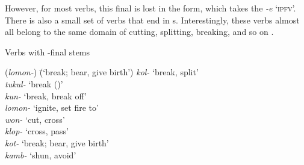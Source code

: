However, for most verbs, this final  is lost in the  form, which takes the  \textit{{}-e} ‘\textsc{ipfv}’. There is also a small set of verbs that end in s. Interestingly, these verbs almost all belong to the same  domain of cutting, splitting, breaking, and so on .

\newpage

\ea%
    \label{ex:verbs:1e}
            Verbs with -final stems\\
\begin{tabbing}
{(\textit{lomon-})} \= {(‘break; bear, give birth’)}\kill
\textit{kol-} \> {‘break, split’}\\
\textit{tukul-} \> {‘break ()’}\\
\textit{kun-} \> {‘break, break off’}\\
\textit{lomon-} \> {‘ignite, set fire to’}\\
\textit{won-} \> {‘cut, cross’}\\
\textit{klop-} \> {‘cross, pass’}\\
\textit{kot-} \> {‘break; bear, give birth’}\\
\textit{kamb-} \> {‘shun, avoid’}
\end{tabbing}
 \z

